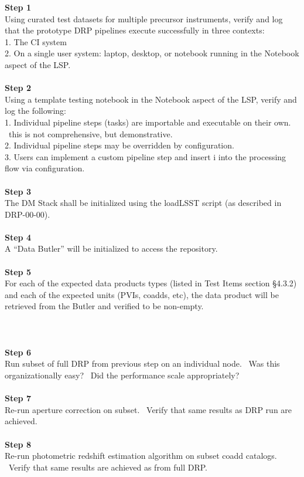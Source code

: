 \textbf{Step 1}\\
Using curated test datasets for multiple precursor instruments, verify
and log that the prototype DRP pipelines execute successfully in three
contexts:\\
1. The CI system\\
2. On a single user system: laptop, desktop, or notebook running in the
Notebook aspect of the LSP.\\
~\\
\textbf{Step 2}\\
Using a template testing notebook in the Notebook aspect of the LSP,
verify and log the following:\\
1. Individual pipeline steps (tasks) are importable and executable on
their own. ~this is not comprehensive, but demonstrative.\\
2. Individual pipeline steps may be overridden by configuration.\\
3. Users can implement a custom pipeline step and insert i into the
processing flow via configuration.\\
~\\
\textbf{Step 3}\\
The DM Stack shall be initialized using the loadLSST script (as
described in DRP-00-00).\\
~\\
\textbf{Step 4}\\
A ``Data Butler'' will be initialized to access the repository.\\
~\\
\textbf{Step 5}\\
For each of the expected data products types (listed in Test Items
section §4.3.2) and each of the expected units (PVIs, coadds, etc), the
data product will be retrieved from the Butler and verified to be
non-empty.\\
~\\
~\\
~\\
\textbf{Step 6}\\
Run subset of full DRP from previous step on an individual node. ~Was
this organizationally easy? ~Did the performance scale appropriately?\\
~\\
\textbf{Step 7}\\
Re-run aperture correction on subset. ~Verify that same results as DRP
run are achieved.\\
~\\
\textbf{Step 8}\\
Re-run photometric redshift estimation algorithm on subset coadd
catalogs. ~Verify that same results are achieved as from full DRP.\\
~\\

